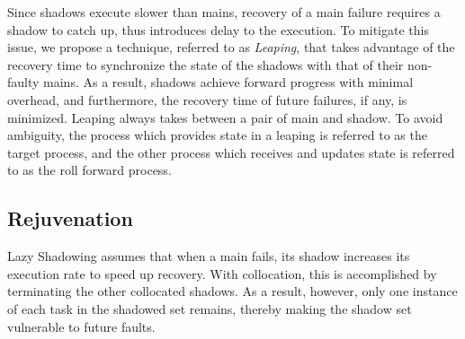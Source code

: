 Since shadows execute slower than mains, recovery of a main failure requires a shadow to catch up, thus introduces delay to the execution. To mitigate this issue, we propose a technique, referred to as \textit{Leaping}, that takes advantage of the recovery time to synchronize the state of the shadows with that of their non-faulty mains. As a result, shadows achieve forward progress with minimal overhead, and furthermore, the recovery time of future failures, if any, is minimized. 
Leaping always takes between a pair of main and shadow. To avoid ambiguity, the process which provides state in a leaping is referred to as the target process, and the other process which receives and updates state is referred to as the roll forward process. 




\subsection{Rejuvenation}


Lazy Shadowing assumes that when a main fails, its shadow increases its execution rate to speed up recovery. %
With collocation, this is accomplished by terminating the other collocated shadows. As a result, however, only one instance of each task in the shadowed set remains, %
thereby making the shadow set vulnerable to future faults.

